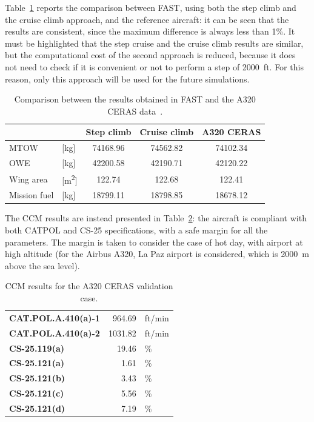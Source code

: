 Table~\ref{tab:fast_base_comparison} reports the comparison between FAST, using both the step climb and the cruise climb approach, and the reference aircraft: it can be seen that the results are consistent, since the maximum difference is always less than 1\%. 
It must be highlighted that the step cruise and the cruise climb results are similar, but the computational cost of the second approach is reduced, because it does not need to check if it is convenient or not to perform a step of 2000~ft. 
For this reason, only this approach will be used for the future simulations. 
\begin{table}[!h]
	\centering
	\begin{tabular}{l l c c c}
		\hline
		& & \textbf{Step climb} & \textbf{Cruise climb} & \textbf{A320 CERAS} \\
		\hline
		MTOW & [\si{\kilogram}] & 74168.96 & 74562.82 & 74102.34 \\
		OWE & [\si{\kilogram}] & 42200.58 & 42190.71 & 42120.22 \\
		Wing area & [\si{\square\meter}] & 122.74 & 122.68 & 122.41 \\
		Mission fuel & [\si{\kilogram}] & 18799.11 & 18798.85 & 18678.12 \\
		\hline
	\end{tabular}
	\caption{Comparison between the results obtained in FAST and the A320 CERAS data~\cite{bib:fast_main}.}
	\label{tab:fast_base_comparison}
\end{table}

The CCM results are instead presented in Table~\ref{tab:fast_base_ccm}: the aircraft is compliant with both CATPOL and CS-25 specifications, with a safe margin for all the parameters.
The margin is taken to consider the case of hot day, with airport at high altitude (for the Airbus A320, La Paz airport is considered, which is 2000~\si{\meter} above the sea level).
\begin{table}[!h]
	\centering
	\begin{tabular}{l r l}
		\hline
		\textbf{CAT.POL.A.410(a)-1} & 964.69 & ft/min \\
		\textbf{CAT.POL.A.410(a)-2} & 1031.82 & ft/min \\
		\textbf{CS-25.119(a)} & 19.46 & \% \\
		\textbf{CS-25.121(a)} & 1.61 & \% \\
		\textbf{CS-25.121(b)} & 3.43 & \% \\
		\textbf{CS-25.121(c)} & 5.56 & \% \\
		\textbf{CS-25.121(d)} & 7.19 & \% \\
		\hline
	\end{tabular}
	\caption{CCM results for the A320 CERAS validation case.}
	\label{tab:fast_base_ccm}
\end{table}

